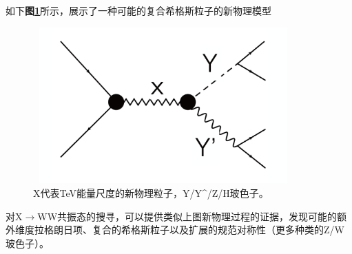 如下\textbf{图\ref{fig:2.9}}所示，展示了一种可能的复合希格斯粒子的新物理模型\cite{Boosting_the_Higgs_boson}
\begin{figure}[H]
 \centering
 \includegraphics[height=6cm, width=10cm]{pictures/diboson_resonance_X.png}
  \caption{X代表TeV能量尺度的新物理粒子，Y/Y^/Z/H玻色子。}
 \label{fig:2.9}
\end{figure}
对X$\to$WW共振态的搜寻，可以提供类似上图新物理过程的证据，发现可能的额外维度拉格朗日项、复合的希格斯粒子以及扩展的规范对称性（更多种类的Z/W玻色子）。

